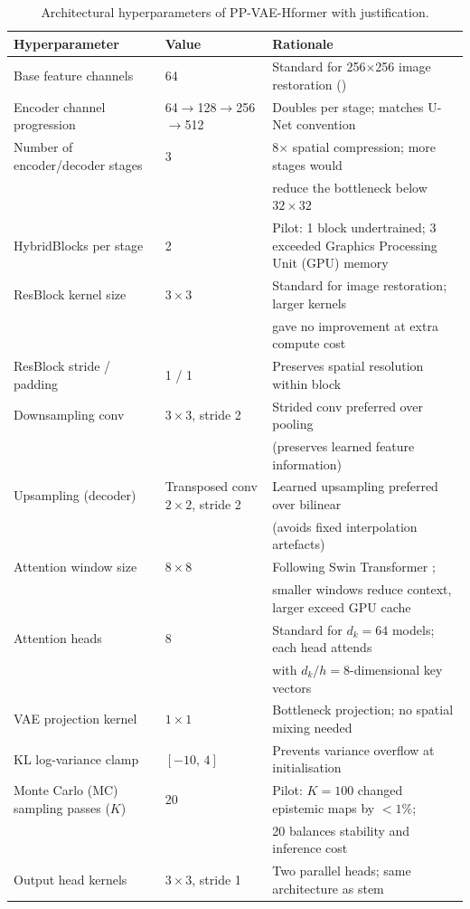 \documentclass[12pt, a4paper, twoside, openright]{book}
\begin{document}
\begin{table}[htbp]
\centering
\caption{Architectural hyperparameters of PP-VAE-Hformer with justification.}
\label{tab:methods:hyperparams}
\small
\begin{tabular}{lll}
\toprule
\textbf{Hyperparameter} & \textbf{Value} & \textbf{Rationale} \\
\midrule
Base feature channels & 64 & Standard for 256$\times$256 image restoration (\cite{zhang_hformer_2023, liang_swinir_2021}) \\
Encoder channel progression & 64$\to$128$\to$256$\to$512 & Doubles per stage; matches U-Net convention \\
Number of encoder/decoder stages & 3 & 8$\times$ spatial compression; more stages would \\
 & & reduce the bottleneck below $32\times32$ \\
HybridBlocks per stage & 2 & Pilot: 1 block undertrained; 3 exceeded Graphics Processing Unit (GPU) memory \\
ResBlock kernel size & $3\times3$ & Standard for image restoration; larger kernels \\
 & & gave no improvement at extra compute cost \\
ResBlock stride / padding & 1 / 1 & Preserves spatial resolution within block \\
Downsampling conv & $3\times3$, stride 2 & Strided conv preferred over pooling \\
 & & (preserves learned feature information) \\
Upsampling (decoder) & Transposed conv $2\times2$, stride 2 & Learned upsampling preferred over bilinear \\
 & & (avoids fixed interpolation artefacts) \\
Attention window size & $8\times8$ & Following Swin Transformer \cite{liu_swin_2021}; \\
 & & smaller windows reduce context, larger exceed GPU cache \\
Attention heads & 8 & Standard for $d_k=64$ models; each head attends \\
 & & with $d_k/h = 8$-dimensional key vectors \\
VAE projection kernel & $1\times1$ & Bottleneck projection; no spatial mixing needed \\
KL log-variance clamp & $[-10,\,4]$ & Prevents variance overflow at initialisation \\
Monte Carlo (MC) sampling passes ($K$) & 20 & Pilot: $K{=}100$ changed epistemic maps by $<1\%$; \\
 & & 20 balances stability and inference cost \\
Output head kernels & $3\times3$, stride 1 & Two parallel heads; same architecture as stem \\
\bottomrule
\end{tabular}
\end{table}
\end{document}
